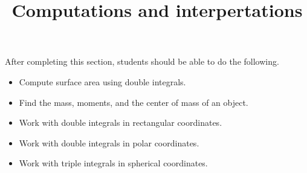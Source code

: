 \documentclass{ximera}
\title{Computations and interpertations}
\begin{document}
\begin{abstract}
\end{abstract}
\maketitle

\begin{sectionOutcomes}

After completing this section, students should be able to do the following.

\begin{itemize}
\item Compute surface area using double integrals.
\item Find the mass, moments, and the center of mass of an object.
\item Work with double integrals in rectangular coordinates.
\item Work with double integrals in polar coordinates.
\item Work with triple integrals in spherical coordinates.
\end{itemize}

\end{sectionOutcomes}
\end{document}
